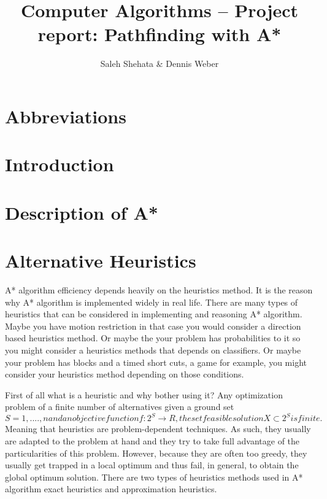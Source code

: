 \documentclass[12pt]{article}
\begin{document}
	
\title{Computer Algorithms -- Project report: Pathfinding with A*}
\author{Saleh Shehata \& Dennis Weber}
\maketitle

\begin{abstract}
\end{abstract}

\section*{Abbreviations}
\begin{acronym}[SIFT]
	\setlength{\parskip}{0ex}
	\setlength{\itemsep}{1ex}
\end{acronym}

\section{Introduction}

\section{Description of A*}

\section{Alternative Heuristics}
A* algorithm efficiency depends heavily on the heuristics method. It is the reason why A* algorithm is implemented widely in real life. There are many types of heuristics that can be considered in implementing and reasoning A* algorithm. Maybe you have motion restriction in that case you would consider a direction based heuristics method. Or maybe the your problem has probabilities to it so you might consider a heuristics methods that depends on classifiers. Or maybe your problem has blocks and a timed short cuts, a game for example, you might consider your heuristics method depending on those conditions.

First of all what is a heuristic and why bother using it? Any optimization problem of a finite number of alternatives given a ground set \begin{math} S = {1,....,n} and an objective function f : 2^S \rightarrow R, the set feasible solution X \subset 2^S is finite.\end{math} Meaning that heuristics are problem-dependent techniques. As such, they usually are adapted to the problem at hand and they try to take full advantage of the particularities of this problem. However, because they are often too greedy, they usually get trapped in a local optimum and thus fail, in general, to obtain the global optimum solution. There are two types of heuristics methods used in A* algorithm exact heuristics and approximation heuristics.
\end{document}
